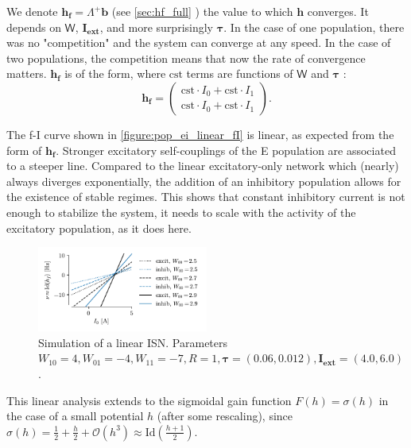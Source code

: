 \documentclass[10pt,conference,compsocconf,a4paper]{IEEEtran}
\renewcommand{\vec}[1]{\boldsymbol{#1}}
\newcommand*{\shortautoref}[1]{%
	\begingroup
	\def\equationautorefname{\textsc{Eq.}}%
	\def\tableautorefname{\textsc{Tab.}}%
	\def\figureautorefname{\textsc{Fig.}}%
	\autoref{#1}%
	\endgroup
}
\begin{document}
		We denote $\vec{h_f} = \Lambda^+ \vec{b}$ (see \shortautoref{sec:hf_full}) the value to which $\vec{h}$ converges. It depends on $\mathsf W$, $\vec{I_{\text{ext}}}$, and more surprisingly $\vec \tau$. In the case of one population, there was no "competition" and the system can converge at any speed. In the case of two populations, the competition means that now the rate of convergence matters. $\vec{h_f}$ is of the form, where $\text{cst}$ terms are functions of $\mathsf W$ and $\vec \tau$ :
\
		\begin{equation*}
			\vec{h_f} = \begin{pmatrix}
				\text{cst} \cdot I_0 + \text{cst} \cdot I_1 \\
				\text{cst} \cdot I_0 + \text{cst} \cdot I_1
			\end{pmatrix}.
		\end{equation*}

		The f-I curve shown in \shortautoref{figure:pop_ei_linear_fI} is linear, as expected from the form of $\vec{h_f}$. Stronger excitatory self-couplings of the E population are associated to a steeper line.
		Compared to the linear excitatory-only network which (nearly) always diverges exponentially, the addition of an inhibitory population allows for the existence of stable regimes.
		This shows that constant inhibitory current is not enough to stabilize the system, it needs to scale with the activity of the excitatory population, as it does here.

		\begin{figure}
			\centering
			\includegraphics[width=0.5\textwidth]{figures/pop_ei_linear_fI.pdf}
			\caption{Simulation of a linear ISN. Parameters $W_{10} = 4, W_{01} = -4, W_{11} = -7, R = 1, \vec \tau = (0.06, 0.012), \vec{I_{\text{ext}}} = (4.0, 6.0)$.}
			\label{figure:pop_ei_linear_fI}
		\end{figure}

		This linear analysis extends to the sigmoidal gain function $F(h) = \sigma(h)$ in the case of a small potential $h$ (after some rescaling), since $\sigma(h) = \frac 12 + \frac h2 + \mathcal{O}(h^3) \approx \text{Id}(\frac {h+1}{2})$.

		
\end{document}
